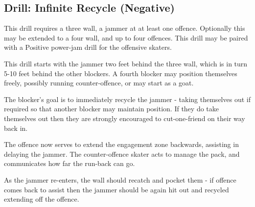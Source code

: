 \subsection*{Drill: Infinite Recycle (Negative)}
\label{drill:power_jam/infinite_recycle}

This drill requires a three wall, a jammer at at least one offence.
Optionally this may be extended to a four wall, and up to four offences.  
This drill may be paired with a Positive power-jam drill for the offensive skaters. 


This drill starts with the jammer two feet behind the three wall, which is in turn 5-10 feet behind the other blockers.
A fourth blocker may position themselves freely, possibly running counter-offence, or may start as a goat.

The blocker's goal is to immediately recycle the jammer - taking themselves out if required so that another blocker may maintain position. 
If they do take themselves out then they are strongly encouraged to cut-one-friend on their way back in. 

The offence now serves to extend the engagement zone backwards, assisting in delaying the jammer.
The counter-offence skater acts to manage the pack, and communicates how far the run-back can go. 

As the jammer re-enters, the wall should recatch and pocket them - if offence comes back to assist then the jammer should be again hit out and recycled extending off the offence.


